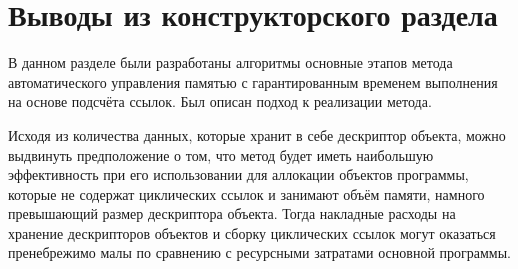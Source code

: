 




\section*{Выводы из конструкторского раздела}

В данном разделе были разработаны алгоритмы основные этапов метода автоматического управления памятью с гарантированным временем выполнения на основе подсчёта ссылок. Был описан подход к реализации метода.	

Исходя из количества данных, которые хранит в себе дескриптор объекта, можно выдвинуть предположение о том, что метод будет иметь наибольшую эффективность при его использовании для аллокации объектов программы, которые не содержат циклических ссылок и занимают объём памяти, намного превышающий размер дескриптора объекта. Тогда накладные расходы на хранение дескрипторов объектов и сборку циклических ссылок могут оказаться пренебрежимо малы по сравнению с ресурсными затратами основной программы.


